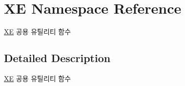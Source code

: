 \hypertarget{namespaceXE}{}\section{XE Namespace Reference}
\label{namespaceXE}


\hyperlink{namespaceXE}{XE} 공용 유틸리티 함수  




\subsection{Detailed Description}
\hyperlink{namespaceXE}{XE} 공용 유틸리티 함수 